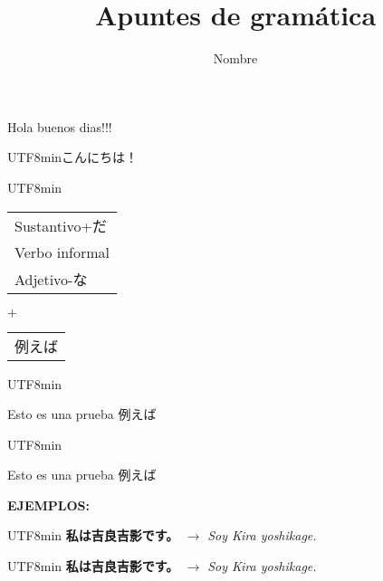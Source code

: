 \documentclass[a4paper, 11pt]{book}
\title{Apuntes de gramática}
\author{Nombre}
\newcommand{\tjp}[1]{\begin{CJK}{UTF8}{min}#1\end{CJK}}
\newcommand{\jpex}[2] {
	\vspace{1.0\baselineskip}
	\begin{CJK}{UTF8}{min}
		\noindent\textbf{\large{#1}}
		$\rightarrow$ \emph{#2}
	\end{CJK}
}
\newcommand{\grpre}[2]{
	\begin{center}
		\begin{CJK}{UTF8}{min}
			\begin{tabular}{l}
				#1
			\end{tabular}
			$+$
			\begin{tabular}{l}
				#2
			\end{tabular}
		\end{CJK}
	\end{center}
}
\newenvironment{defrapida}[1][\unskip]{
	\noindent
	\begin{CJK}{UTF8}{min}
		\begin{tcolorbox}[colback=celeste, title=#1]
} {
		\end{tcolorbox}
	\end{CJK}
}
\begin{document}
	\maketitle
	
	Hola buenos dias!!! \tjp{こんにちは！}
	
	\grpre{
		Sustantivo+だ \\ Verbo informal \\ Adjetivo-な
	} {
		例えば
	}

	\begin{defrapida}[Prueba de definicion 例えば]
		Esto es una prueba 例えば
	\end{defrapida}
	
	\begin{defrapida}
		Esto es una prueba 例えば
	\end{defrapida}

	\textbf{EJEMPLOS: }

	\jpex{
		私は吉良吉影です。
	}{
		Soy Kira yoshikage.
	}
	
	\jpex{
		私は吉良吉影です。
	}{
		Soy Kira yoshikage.
	}
\end{document}
